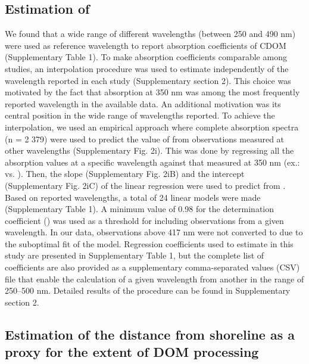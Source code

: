 \subsection*{Estimation of }

We found that a wide range of different wavelengths (between 250 and 490 nm) were used as reference wavelength to report absorption coefficients of CDOM (Supplementary Table 1). To make absorption coefficients comparable among studies, an interpolation procedure was used to estimate  independently of the wavelength reported in each study (Supplementary section 2). This choice was motivated by the fact that absorption at 350 nm was among the most frequently reported wavelength in the available data. An additional motivation was its central position in the wide range of wavelengths reported. To achieve the interpolation, we used an empirical approach where complete absorption spectra (n = 2 379) were used to predict the value of  from observations measured at other wavelengths (Supplementary Fig. 2i). This was done by regressing all the absorption values at a specific wavelength against that measured at 350 nm (ex.:  vs. ). Then, the slope (Supplementary Fig. 2iB) and the intercept (Supplementary Fig. 2iC) of the linear regression were used to predict  from \acdom{\lambda}. Based on reported wavelengths, a total of 24 linear models were made (Supplementary Table 1). A minimum value of 0.98 for the determination coefficient (\rr) was used as a threshold for including observations from a given wavelength. In our data, observations above 417 nm were not converted to  due to the suboptimal fit of the model. Regression coefficients used to estimate  in this study are presented in Supplementary Table 1, but the complete list of coefficients are also provided as a supplementary comma-separated values (CSV) file that enable the calculation of a given wavelength from another in the range of 250–500 nm. Detailed results of the procedure can be found in Supplementary section 2.

\subsection*{Estimation of the distance from shoreline as a proxy for the extent of DOM processing}

